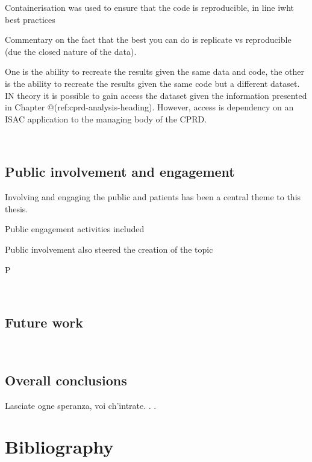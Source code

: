 \documentclass[a4paper, twoside]{templates/ociamthesis}
\begin{document}
Containerisation was used to ensure that the code is reproducible, in line iwht best practices

Commentary on the fact that the best you can do is replicate vs reproducible (due the closed nature of the data).

One is the ability to recreate the results given the same data and code, the other is the ability to recreate the results given the same code but a different dataset. IN theory it is possible to gain access the dataset given the information presented in Chapter @(ref:cprd-analysis-heading). However, access is dependency on an ISAC application to the managing body of the CPRD.

~

\hypertarget{disc-PPI}{%
\section{Public involvement and engagement}\label{disc-PPI}}

Involving and engaging the public and patients has been a central theme to this thesis.

Public engagement activities included

Public involvement also steered the creation of the topic

P

~

\hypertarget{future-work}{%
\section{Future work}\label{future-work}}

~

\hypertarget{overall-conclusions}{%
\section{Overall conclusions}\label{overall-conclusions}}

\begin{savequote}
Lasciate ogne speranza, voi ch'intrate. . .
\end{savequote}

\hypertarget{bibliography}{%
\chapter{Bibliography}\label{bibliography}}
\end{document}
